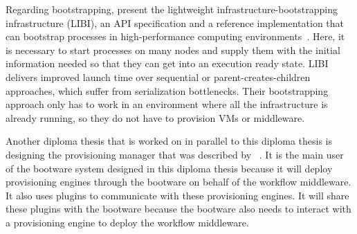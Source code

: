 Regarding bootstrapping, \citeauthor*{libi} present the lightweight infrastructure-bootstrapping infrastructure (LIBI), an API specification and a reference implementation that can bootstrap processes in high-performance computing environments~\autocite{libi}.
Here, it is necessary to start processes on many nodes and supply them with the initial information needed so that they can get into an execution ready state.
LIBI delivers improved launch time over sequential or parent-creates-children approaches, which suffer from serialization bottlenecks.
Their bootstrapping approach only has to work in an environment where all the infrastructure is already running, so they do not have to provision VMs or middleware.

Another diploma thesis that is worked on in parallel to this diploma thesis is designing the provisioning manager that was described by \citeauthor*{provisioning:dynamic}~\autocite{nedim}.
It is the main user of the bootware system designed in this diploma thesis because it will deploy provisioning engines through the bootware on behalf of the workflow middleware.
It also uses plugins to communicate with these provisioning engines.
It will share these plugins with the bootware because the bootware also needs to interact with a provisioning engine to deploy the workflow middleware.
